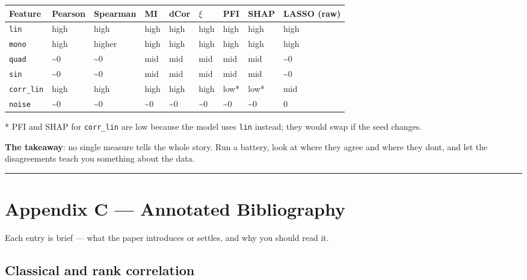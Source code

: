 \documentclass{article}
\let\oldsection\section
\renewcommand{\section}{\clearpage\oldsection}
\begin{document}
{\def\LTcaptype{none} %
\begin{longtable}[]{@{}lllllllll@{}}
\toprule\noalign{}
Feature & Pearson & Spearman & MI & dCor & \(\xi\) & PFI & SHAP & LASSO
(raw) \\
\midrule\noalign{}
\endhead
\bottomrule\noalign{}
\endlastfoot
\texttt{lin} & high & high & high & high & high & high & high & high \\
\texttt{mono} & high & higher & high & high & high & high & high &
high \\
\texttt{quad} & \textasciitilde0 & \textasciitilde0 & mid & mid & mid &
mid & mid & \textasciitilde0 \\
\texttt{sin} & \textasciitilde0 & \textasciitilde0 & mid & mid & mid &
mid & mid & \textasciitilde0 \\
\texttt{corr\_lin} & high & high & high & high & high & low* & low* &
mid \\
\texttt{noise} & \textasciitilde0 & \textasciitilde0 & \textasciitilde0
& \textasciitilde0 & \textasciitilde0 & \textasciitilde0 &
\textasciitilde0 & 0 \\
\end{longtable}
}

* PFI and SHAP for \texttt{corr\_lin} are low because the model uses
\texttt{lin} instead; they would swap if the seed changes.

\textbf{The takeaway}: no single measure tells the whole story. Run a
battery, look at where they agree and where they don\textquotesingle t,
and let the disagreements teach you something about the data.

\begin{center}\rule{0.5\linewidth}{0.5pt}\end{center}

\section{Appendix C --- Annotated
Bibliography}\label{appendix-c--annotated-bibliography}

Each entry is brief --- what the paper introduces or settles, and why
you should read it.

\subsection{Classical and rank
correlation}\label{classical-and-rank-correlation}
\end{document}
